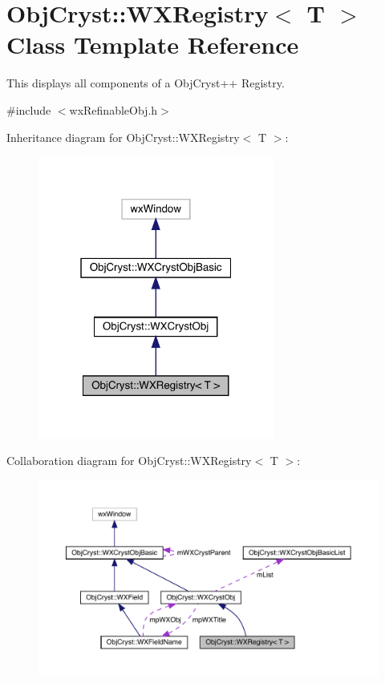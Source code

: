 \hypertarget{class_obj_cryst_1_1_w_x_registry}{}\section{Obj\+Cryst\+::W\+X\+Registry$<$ T $>$ Class Template Reference}
\label{class_obj_cryst_1_1_w_x_registry}


This displays all components of a Obj\+Cryst++ Registry.  




{\ttfamily \#include $<$wx\+Refinable\+Obj.\+h$>$}



Inheritance diagram for Obj\+Cryst\+::W\+X\+Registry$<$ T $>$\+:
\nopagebreak
\begin{figure}[H]
\begin{center}
\leavevmode
\includegraphics[width=220pt]{class_obj_cryst_1_1_w_x_registry__inherit__graph}
\end{center}
\end{figure}


Collaboration diagram for Obj\+Cryst\+::W\+X\+Registry$<$ T $>$\+:
\nopagebreak
\begin{figure}[H]
\begin{center}
\leavevmode
\includegraphics[width=350pt]{class_obj_cryst_1_1_w_x_registry__coll__graph}
\end{center}
\end{figure}
